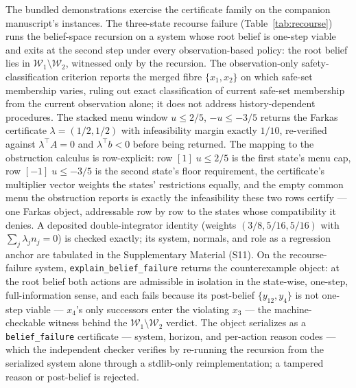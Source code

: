 \documentclass[11pt]{article}
\begin{document}
The bundled demonstrations exercise the certificate family on the companion
manuscript's instances. The three-state recourse failure
(Table~\ref{tab:recourse}) runs the
belief-space recursion on a system whose root belief is one-step viable and
exits at the second step under every observation-based policy: the root
belief lies in $\mathcal{W}_1 \setminus \mathcal{W}_2$, witnessed only by
the recursion. The observation-only safety-classification criterion
reports the merged fibre $\{x_1, x_2\}$ on which safe-set membership
varies, ruling out exact classification of current safe-set membership
from the current observation alone; it does not address
history-dependent procedures. The stacked menu window $u \leq 2/5$, $-u \leq -3/5$ returns the
Farkas certificate $\lambda = (1/2, 1/2)$ with infeasibility margin exactly
$1/10$, re-verified against $\lambda^{\top} A = 0$ and
$\lambda^{\top} b < 0$ before being returned. The mapping to the
obstruction calculus is row-explicit: row $[1]\; u \leq 2/5$ is the first
state's menu cap, row $[-1]\; u \leq -3/5$ is the second state's floor
requirement, the certificate's multiplier vector weights the states'
restrictions equally, and the empty common menu the obstruction reports
is exactly the infeasibility these two rows certify --- one Farkas object,
addressable row by row to the states whose compatibility it denies. A deposited
double-integrator identity (weights $(3/8, 5/16, 5/16)$ with
$\sum_j \lambda_j n_j = 0$) is checked exactly; its system, normals,
and role as a regression anchor are tabulated in the Supplementary
Material (S11). On the recourse-failure
system, \texttt{explain\_belief\_failure} returns the counterexample
object: at the root belief both actions are admissible in isolation in
the state-wise, one-step, full-information sense, and
each fails because its post-belief $\{y_{12}, y_4\}$ is not one-step
viable --- $x_4$'s only successors enter the violating $x_3$ --- the
machine-checkable witness behind the
$\mathcal{W}_1 \setminus \mathcal{W}_2$ verdict. The object serializes
as a \texttt{belief\_failure} certificate --- system, horizon, and
per-action reason codes --- which the independent checker verifies by
re-running the recursion from the serialized system alone through a
stdlib-only reimplementation; a tampered reason or post-belief is
rejected.
\end{document}
